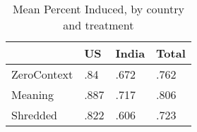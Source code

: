 \begin{table}[htbp]
\caption{\label{InducedByGroup} Mean Percent Induced, by country and treatment}\centering\medskip
\begin{tabular}{|l|l|l|l|}\hline  
 & US  & India  & Total  \\ \hline  
ZeroContext & .84 & .672 & .762 \\ \hline 
Meaning & .887 & .717 & .806 \\ \hline 
Shredded & .822 & .606 & .723 \\ \hline 
  \end{tabular}
\end{table}
